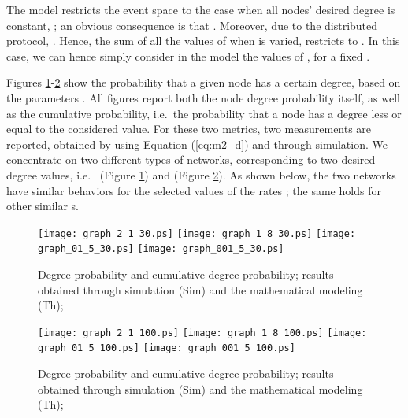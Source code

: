 \documentclass[a4paper,twosided]{article}
\begin{document}
The model restricts the event space to the case when all nodes' desired degree is constant, ; an obvious consequence is that . Moreover, due to the distributed protocol, . Hence, the sum of all the values of  when  is varied, restricts to . In this case, we can hence simply consider in the model the values of , for a fixed .



Figures \ref{fig:fig1}-\ref{fig:fig2} show the probability that a given node has a certain degree, based on the parameters .
All figures report both the node degree probability itself, as well as the cumulative probability, i.e.~the probability that a node has a degree less or equal to the considered value. For these two metrics, two measurements are reported, obtained by using Equation (\ref{eq:m2_d}) and through simulation.
We concentrate on two different types of networks, corresponding to two desired degree values, i.e.~ (Figure \ref{fig:fig1}) and  (Figure \ref{fig:fig2}). 
As shown below, the two networks have similar behaviors for the selected values of the rates ; the same holds for other similar s.


\begin{figure}[t]
   \centering
   \texttt{[image: graph\_2\_1\_30.ps]}
   \texttt{[image: graph\_1\_8\_30.ps]}
   \texttt{[image: graph\_01\_5\_30.ps]}
   \texttt{[image: graph\_001\_5\_30.ps]}
   \caption{Degree probability and cumulative degree probability; results obtained through simulation (Sim) and the mathematical modeling (Th); }
   \label{fig:fig1}
\end{figure}

\begin{figure}[t]
   \centering
   \texttt{[image: graph\_2\_1\_100.ps]}
   \texttt{[image: graph\_1\_8\_100.ps]}
   \texttt{[image: graph\_01\_5\_100.ps]}
   \texttt{[image: graph\_001\_5\_100.ps]}
   \caption{Degree probability and cumulative degree probability; results obtained through simulation (Sim) and the mathematical modeling (Th); }
   \label{fig:fig2}
\end{figure}
\end{document}
